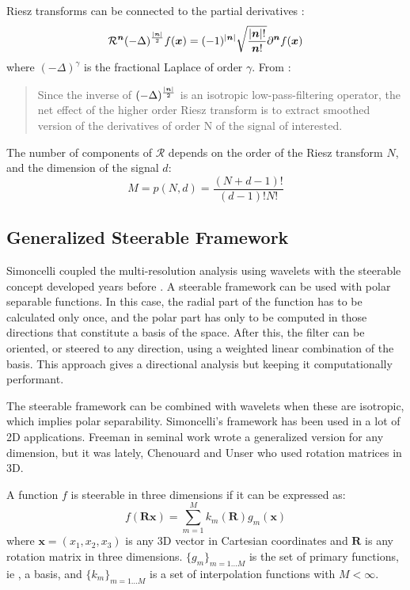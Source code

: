 Riesz transforms can be connected to the partial derivatives \cite{unser_steerable_2011}:
\begin{equation*}
\label{eq:riesz_partial_derivatives}
\mathcal{R}^{\bm{n}}(-\Delta)^{\frac{\abs{\bm{n}}}{2}}f(\bm{x}) = (-1)^{\abs{\bm{n}}}\sqrt{\frac{\abs{\bm{n}}!}{\bm{n}!}}\partial^{\bm{n}}f(\bm{x})
\end{equation*}
where $(-\Delta)^\gamma$ is the fractional Laplace of order $\gamma$. From \cite{unser_steerable_2011}: \blockquote{Since the inverse of $(-\Delta)^{\frac{\abs{\bm{n}}}{2}}$ is an isotropic low-pass-filtering operator, the net effect of the higher order Riesz transform is to extract smoothed version of the derivatives of order N of the signal of interested.}

The number of components of $\bm{\mathcal{R}}$ depends on the order of the Riesz transform $N$, and the dimension of the signal $d$:
\begin{equation}
\label{eq:riesz_components}
 M = p(N,d) = \frac{(N+d-1)!}{(d-1)! N!}
\end{equation}

\subsection{Generalized Steerable Framework}
Simoncelli \cite{simoncelli_steerable_1995} coupled the multi-resolution analysis using wavelets with the steerable concept developed years before \cite{freeman_design_1991}. A steerable framework can be used with polar separable functions. In this case, the radial part of the function has to be calculated only once, and the polar part has only to be computed in those directions that constitute a basis of the space. After this, the filter can be oriented, or steered to any direction, using a weighted linear combination of the basis. This approach gives a directional analysis but keeping it computationally performant.

The steerable framework can be combined with wavelets when these are isotropic, which implies polar separability.
Simoncelli's framework has been used in a lot of 2D applications. Freeman in seminal work \cite{freeman_design_1991} wrote a generalized version for any dimension, but it was lately, Chenouard and Unser \cite{held_steerable_2010,unser_steerable_2011,chenouard_3d_2012} who used rotation matrices in 3D.

\begin{definition}
A function $f$ is steerable in three dimensions if it can be expressed as:
\begin{equation}
  f(\bm{Rx}) = \sum_{m=1}^M k_m(\bm{R})g_m(\bm{x})
\end{equation}
where $\bm{x} = (x_1,x_2,x_3)$ is any 3D vector in Cartesian coordinates and $\bm{R}$ is any rotation matrix in three dimensions.
$\{g_m\}_{m=1...M}$ is the set of primary functions, ie , a basis, and $\{k_m\}_{m=1...M}$ is a set of interpolation functions with $M < \infty$.
\end{definition}

